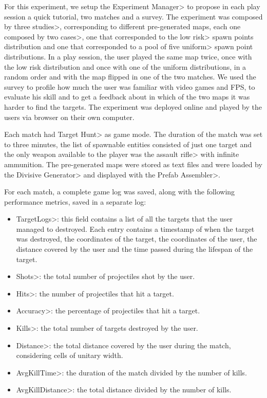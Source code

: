 For this experiment, we setup the \<Experiment Manager> to propose in each play session a quick tutorial, two matches and a survey. The experiment was composed by three \<studies>, corresponding to different pre-generated maps, each one composed by two \<cases>, one that corresponded to the \<low risk> spawn points distribution and one that corresponded to a pool of five \<uniform> spawn point distributions. In a play session, the user played the same map twice, once with the low risk distribution and once with one of the uniform distributions, in a random order and with the map flipped in one of the two matches. We used the survey to profile how much the user was familiar with video games and FPS, to evaluate his skill and to get a feedback about in which of the two maps it was harder to find the targets. The experiment was deployed online and played by the users via browser on their own computer.

\par

Each match had \<Target Hunt> as game mode. The duration of the match was set to three minutes, the list of spawnable entities consisted of just one target and the only weapon available to the player was the \<assault rifle> with infinite ammunition. The pre-generated maps were stored as text files and were loaded by the \<Divisive Generator> and displayed with the \<Prefab Assembler>. 

\par
 
For each match, a complete game log was saved, along with the following performance metrics, saved in a separate log:
 
 \begin{itemize}
\item \<TargetLogs>: this field contains a list of all the targets that the user managed to destroyed. Each entry contains a timestamp of when the target was destroyed, the coordinates of the target, the coordinates of the user, the distance covered by the user and the time passed during the lifespan of the target.
\item \<Shots>: the total number of projectiles shot by the user.
\item \<Hits>: the number of projectiles that hit a target.
\item \<Accuracy>: the percentage of projectiles that hit a target.
\item \<Kills>: the total number of targets destroyed by the user.
\item \<Distance>: the total distance covered by the user during the match, considering cells of unitary width.
\item \<AvgKillTime>: the duration of the match divided by the number of kills.
\item \<AvgKillDistance>: the total distance divided by the number of kills.
\end{itemize}

